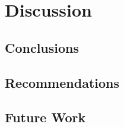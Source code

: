 \chapter{Discussion}

	
\section{Conclusions}


\section{Recommendations} \label{sec:recommendations}


\section{Future Work}

